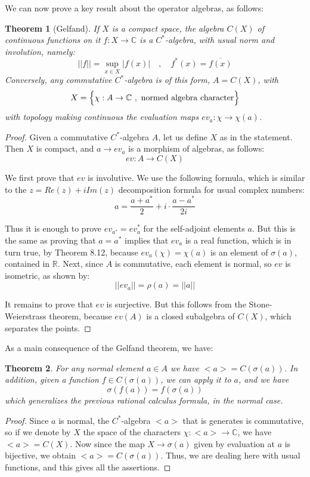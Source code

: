 \documentclass[12pt]{amsbook}
\newtheorem{theorem}{Theorem}[chapter]
\begin{document}
We can now prove a key result about the operator algebras, as follows:


\begin{theorem}[Gelfand]
If $X$ is a compact space,  the algebra $C(X)$ of continuous functions on it $f:X\to\mathbb C$ is a $C^*$-algebra, with usual norm and involution, namely:
$$||f||=\sup_{x\in X}|f(x)|\quad,\quad 
f^*(x)=\overline{f(x)}$$
Conversely, any commutative $C^*$-algebra is of this form, $A=C(X)$, with 
$$X=\Big\{\chi:A\to\mathbb C\ ,\ {\rm normed\ algebra\ character}\Big\}$$
with topology making continuous the evaluation maps $ev_a:\chi\to\chi(a)$.
\end{theorem}

\begin{proof}
Given a commutative $C^*$-algebra $A$, let us define $X$ as in the statement. Then $X$ is compact, and $a\to ev_a$ is a morphism of algebras, as follows:
$$ev:A\to C(X)$$

We first prove that $ev$ is involutive. We use the following formula, which is similar to the $z=Re(z)+iIm(z)$ decomposition formula for usual complex numbers:
$$a=\frac{a+a^*}{2}+i\cdot\frac{a-a^*}{2i}$$

Thus it is enough to prove $ev_{a^*}=ev_a^*$ for the self-adjoint elements $a$. But this is the same as proving that $a=a^*$ implies that $ev_a$ is a real function, which is in turn true, by Theorem 8.12, because $ev_a(\chi)=\chi(a)$ is an element of $\sigma(a)$, contained in $\mathbb R$. Next, since $A$ is commutative, each element is normal, so $ev$ is isometric, as shown by:
$$||ev_a||
=\rho(a)
=||a||$$

It remains to prove that $ev$ is surjective. But this follows from the Stone-Weierstrass theorem, because $ev(A)$ is a closed subalgebra of $C(X)$, which separates the points.
\end{proof}

As a main consequence of the Gelfand theorem, we have:

\begin{theorem}
For any normal element $a\in A$ we have $<a>=C(\sigma(a))$. In addition, given a function $f\in C(\sigma(a))$, we can apply it to $a$, and we have
$$\sigma(f(a))=f(\sigma(a))$$
which generalizes the previous rational calculus formula, in the normal case.
\end{theorem}

\begin{proof}
Since $a$ is normal, the $C^*$-algebra $<a>$ that is generates is commutative, so if we denote by $X$ the space of the characters $\chi:<a>\to\mathbb C$, we have $<a>=C(X)$. Now since the map $X\to\sigma(a)$ given by evaluation at $a$ is bijective, we obtain $<a>=C(\sigma(a))$. Thus, we are dealing here with usual functions, and this gives all the assertions.
\end{proof}
\end{document}
